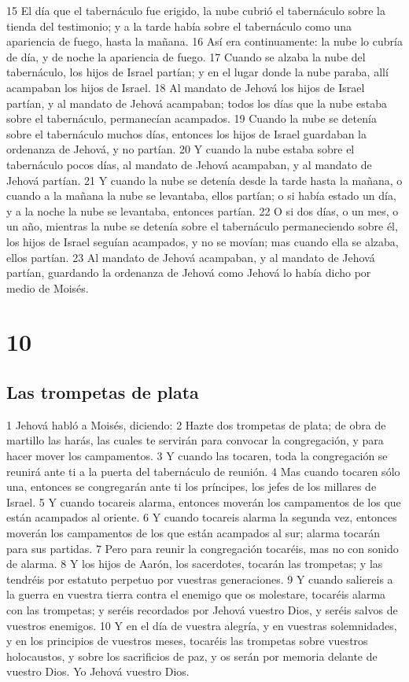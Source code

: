 15 El día que el tabernáculo fue erigido, la nube cubrió el tabernáculo sobre la tienda del testimonio; y a la tarde había sobre el tabernáculo como una apariencia de fuego, hasta la mañana.
16 Así era continuamente: la nube lo cubría de día, y de noche la apariencia de fuego.
17 Cuando se alzaba la nube del tabernáculo, los hijos de Israel partían; y en el lugar donde la nube paraba, allí acampaban los hijos de Israel.
18 Al mandato de Jehová los hijos de Israel partían, y al mandato de Jehová acampaban; todos los días que la nube estaba sobre el tabernáculo, permanecían acampados.
19 Cuando la nube se detenía sobre el tabernáculo muchos días, entonces los hijos de Israel guardaban la ordenanza de Jehová, y no partían.
20 Y cuando la nube estaba sobre el tabernáculo pocos días, al mandato de Jehová acampaban, y al mandato de Jehová partían.
21 Y cuando la nube se detenía desde la tarde hasta la mañana, o cuando a la mañana la nube se levantaba, ellos partían; o si había estado un día, y a la noche la nube se levantaba, entonces partían.
22 O si dos días, o un mes, o un año, mientras la nube se detenía sobre el tabernáculo permaneciendo sobre él, los hijos de Israel seguían acampados, y no se movían; mas cuando ella se alzaba, ellos partían.
23 Al mandato de Jehová acampaban, y al mandato de Jehová partían, guardando la ordenanza de Jehová como Jehová lo había dicho por medio de Moisés.

\chapter{10}

\section*{Las trompetas de plata }

1 Jehová habló a Moisés, diciendo:
2 Hazte dos trompetas de plata; de obra de martillo las harás, las cuales te servirán para convocar la congregación, y para hacer mover los campamentos.
3 Y cuando las tocaren, toda la congregación se reunirá ante ti a la puerta del tabernáculo de reunión.
4 Mas cuando tocaren sólo una, entonces se congregarán ante ti los príncipes, los jefes de los millares de Israel.
5 Y cuando tocareis alarma, entonces moverán los campamentos de los que están acampados al oriente.
6 Y cuando tocareis alarma la segunda vez, entonces moverán los campamentos de los que están acampados al sur; alarma tocarán para sus partidas.
7 Pero para reunir la congregación tocaréis, mas no con sonido de alarma.
8 Y los hijos de Aarón, los sacerdotes, tocarán las trompetas; y las tendréis por estatuto perpetuo por vuestras generaciones.
9 Y cuando saliereis a la guerra en vuestra tierra contra el enemigo que os molestare, tocaréis alarma con las trompetas; y seréis recordados por Jehová vuestro Dios, y seréis salvos de vuestros enemigos.
10 Y en el día de vuestra alegría, y en vuestras solemnidades, y en los principios de vuestros meses, tocaréis las trompetas sobre vuestros holocaustos, y sobre los sacrificios de paz, y os serán por memoria delante de vuestro Dios. Yo Jehová vuestro Dios.

